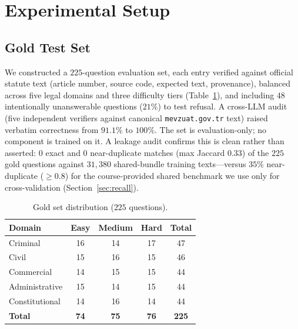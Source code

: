 \documentclass[conference]{IEEEtran}
\begin{document}
\section{Experimental Setup}
\subsection{Gold Test Set}
We constructed a $225$-question evaluation set, each entry verified against
official statute text (article number, source code, expected text, provenance),
balanced across five legal domains and three difficulty tiers
(Table~\ref{tab:gold}), and including $48$ intentionally unanswerable questions
($21\%$) to test refusal. A cross-LLM audit (five independent verifiers against
canonical \texttt{mevzuat.gov.tr} text) raised verbatim correctness from
$91.1\%$ to $100\%$. The set is evaluation-only; no component is trained on it.
A leakage audit confirms this is clean rather than asserted: $0$ exact and $0$
near-duplicate matches (max Jaccard $0.33$) of the $225$ gold questions against
$31{,}380$ shared-bundle training texts---versus $35\%$ near-duplicate
($\geq 0.8$) for the course-provided shared benchmark we use only for
cross-validation (Section~\ref{sec:recall}).

\begin{table}[t]
\caption{Gold set distribution ($225$ questions).}
\label{tab:gold}
\centering\footnotesize
\begin{tabular}{@{}lcccc@{}}
\toprule
Domain & Easy & Medium & Hard & Total \\
\midrule
Criminal        & 16 & 14 & 17 & 47 \\
Civil           & 15 & 16 & 15 & 46 \\
Commercial      & 14 & 15 & 15 & 44 \\
Administrative  & 15 & 14 & 15 & 44 \\
Constitutional  & 14 & 16 & 14 & 44 \\
\midrule
\textbf{Total}  & \textbf{74} & \textbf{75} & \textbf{76} & \textbf{225}\\
\bottomrule
\end{tabular}
\end{table}
\end{document}
